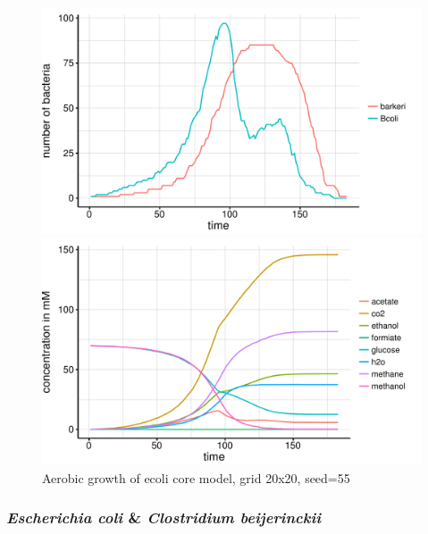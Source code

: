 \begin{figure}[h]
  \centering
  \begin{minipage}[t]{0.45\textwidth}
    \includegraphics[width=\textwidth]{../results/barkeri_ecoli_20x20_seed4612_growth.pdf}
  \end{minipage}
  \begin{minipage}[t]{0.45\textwidth}
    \includegraphics[width=\textwidth]{../results/barkeri_ecoli_20x20_seed4612_subs.pdf}
  \end{minipage}
  \caption{Aerobic growth of ecoli core model, grid 20x20, seed=55}
\end{figure}

\subsubsection{\textit{Escherichia coli} \& \textit{Clostridium beijerinckii}}

